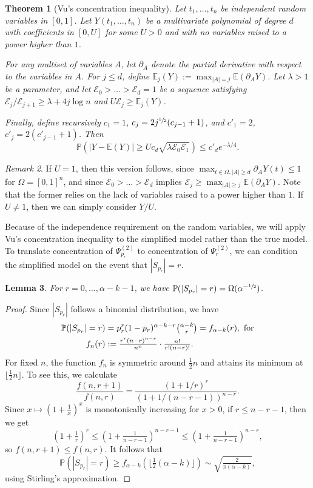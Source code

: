 \documentclass{article}
\theoremstyle{plain}
\newtheorem{theorem}{Theorem}[section]
\theoremstyle{remark}
\newtheorem{remark}[theorem]{Remark}
\theoremstyle{plain}
\newtheorem{lemma}[theorem]{Lemma}
\numberwithin{equation}{section}
\begin{document}
	\begin{theorem}[Vu's concentration inequality]
		Let $t_1,\ldots,t_n$ be independent random variables in $[0,1]$. Let $Y(t_1,\ldots,t_n)$ be a multivariate polynomial of degree $d$ with coefficients in $[0,U]$ for some $U>0$ and with no variables raised to a power higher than $1$.
		
		For any multiset of variables $A$, let $\partial_A$ denote the partial derivative with respect to the variables in $A$. For $j\leq d$, define $\mathbb{E}_j(Y):=\max_{|A|=j}\mathbb{E}(\partial_AY)$. Let $\lambda>1$ be a parameter, and let $\mathcal{E}_0>\ldots>\mathcal{E}_d=1$ be a sequence satisfying $\mathcal{E}_j/\mathcal{E}_{j+1}\geq\lambda+4j\log n$ and $U\mathcal{E}_j\geq\mathbb{E}_j(Y)$.
		
		Finally, define recursively $c_1=1$, $c_j=2j^{\sfrac12}(c_{j-1}+1)$, and $c'_1=2$, $c'_j=2(c'_{j-1}+1)$. Then $$\mathbb{P}\left(|Y-\mathbb{E}(Y)|\geq Uc_d\sqrt{\lambda\mathcal{E}_0\mathcal{E}_1}\right)\leq c'_de^{-\lambda/4}.$$
	\end{theorem}
	
	\begin{remark}
		If $U=1$, then this version follows, since $\max_{t\in\Omega,|A|\geq d}\partial_AY(t)\leq1$ for $\Omega=[0,1]^n$, and since $\mathcal{E}_0>\ldots>\mathcal{E}_d$ implies $\mathcal{E}_j\geq\max_{|A|\geq j}\mathbb{E}(\partial_AY)$. Note that the former relies on the lack of variables raised to a power higher than $1$. If $U\neq1$, then we can simply consider $Y/U$.
	\end{remark}
	
	Because of the independence requirement on the random variables, we will apply Vu's concentration inequality to the simplified model rather than the true model. To translate concentration of $\Psi_{p_r}^{(2)}$ to concentration of $\Psi_r^{(2)}$, we can condition the simplified model on the event that $|S_{p_r}|=r$.
	
	\begin{lemma}\label{lemma_reduction}
		For $r=0,\ldots,\alpha-k-1$, we have $\mathbb{P}(|S_{p_r}|=r)=\Omega(\alpha^{-\sfrac12})$.
	\end{lemma}
	
	\begin{proof}
		Since $|S_{p_r}|$ follows a binomial distribution, we have
		\begin{align}
			\mathbb{P}(|S_{p_r}|=r)&=p_r^r(1-p_r)^{\alpha-k-r}\tbinom{\alpha-k}{r}=f_{\alpha-k}(r),\ \text{for}
			\\f_n(r)&:=\tfrac{r^r(n-r)^{n-r}}{n^n}\cdot\tfrac{n!}{r!(n-r)!}.
		\end{align}
		For fixed $n$, the function $f_n$ is symmetric around $\tfrac12n$ and attains its minimum at $\lfloor\tfrac12n\rfloor$. To see this, we calculate $$\frac{f(n,r+1)}{f(n,r)}=\frac{(1+1/r)^r}{(1+1/(n-r-1))^{n-r}}.$$ Since $x\mapsto(1+\tfrac1x)^x$ is monotonically increasing for $x>0$, if $r\leq n-r-1$, then we get $$(1+\tfrac1r)^r\leq(1+\tfrac1{n-r-1})^{n-r-1}\leq(1+\tfrac1{n-r-1})^{n-r},$$ so $f(n,r+1)\leq f(n,r)$. It follows that $$\mathbb{P}(|S_{p_r}|=r)\geq f_{\alpha-k}(\lfloor\tfrac12(\alpha-k)\rfloor)\sim\sqrt{\tfrac2{\pi(\alpha-k)}},$$ using Stirling's approximation.
	\end{proof}
	
\end{document}
